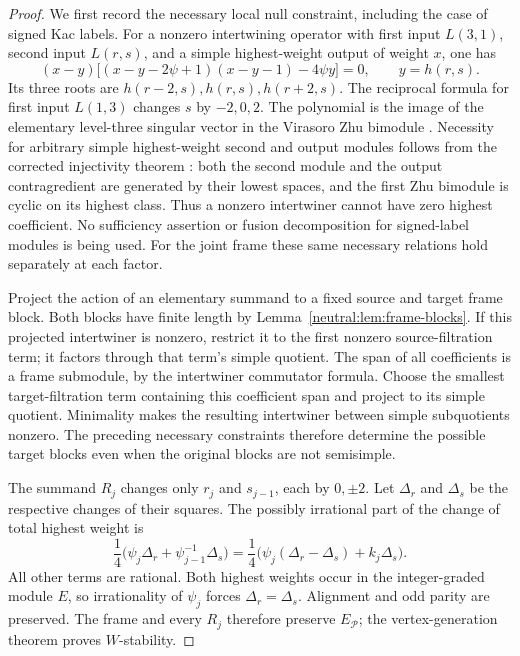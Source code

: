 \documentclass[11pt,a4paper]{article}
\numberwithin{equation}{section}
\theoremstyle{definition}\newtheorem{definition}[theorem]{Definition}
\theoremstyle{remark}\newtheorem{remark}[theorem]{Remark}
\begin{document}
\begin{proof}
We first record the necessary local null constraint, including the
case of signed Kac labels.  For a nonzero intertwining operator with
first input $L(3,1)$, second input $L(r,s)$, and a simple highest-weight
output of weight $x$, one has
\[
 (x-y)\bigl[(x-y-2\psi+1)(x-y-1)-4\psi y\bigr]=0,
                    \qquad y=h(r,s).
\]
Its three roots are $h(r-2,s),h(r,s),h(r+2,s)$.  The reciprocal formula
for first input $L(1,3)$ changes $s$ by $-2,0,2$.
The polynomial is the image of the elementary level-three singular
vector in the Virasoro Zhu bimodule
\cite[Proposition 5.2.3]{virasoro}.  Necessity for arbitrary simple
highest-weight second and output modules follows from the corrected
injectivity theorem \cite[Lemma 5.5 and Propositions 5.6--5.8]{huangyang}:
both the second module and the output contragredient are generated by
their lowest spaces, and the first Zhu bimodule is cyclic on its
highest class.  Thus a nonzero intertwiner cannot have zero highest
coefficient.  No sufficiency assertion or fusion decomposition for
signed-label modules is being used.  For the joint frame these same
necessary relations hold separately at each factor.

Project the action of an elementary summand to a fixed source and
target frame block.  Both blocks have finite length by
Lemma~\ref{neutral:lem:frame-blocks}.  If this projected intertwiner is
nonzero, restrict it to the first nonzero source-filtration term;
it factors through that term's simple quotient.  The span of all
coefficients is a frame submodule, by the intertwiner commutator
formula.  Choose the smallest target-filtration term containing this
coefficient span and project to its simple quotient.  Minimality makes
the resulting intertwiner between simple subquotients nonzero.
The preceding necessary constraints therefore determine
the possible target blocks even when the original blocks are not
semisimple.

The summand $R_j$ changes only $r_j$ and $s_{j-1}$, each by $0,\pm2$.
Let $\Delta_r$ and $\Delta_s$ be the respective changes of their
squares.  The possibly irrational part of the change of total
highest weight is
\[
 \frac14\bigl(\psi_j\Delta_r+\psi_{j-1}^{-1}\Delta_s\bigr)
 =\frac14\bigl(\psi_j(\Delta_r-\Delta_s)+k_j\Delta_s\bigr).
\]
All other terms are rational.  Both highest weights occur in the
integer-graded module $E$, so irrationality of $\psi_j$ forces
$\Delta_r=\Delta_s$.  Alignment and odd parity are preserved.
The frame and every $R_j$ therefore preserve $E_{\mathscr P}$;
the vertex-generation theorem proves $W$-stability.


\end{proof}
\end{document}
